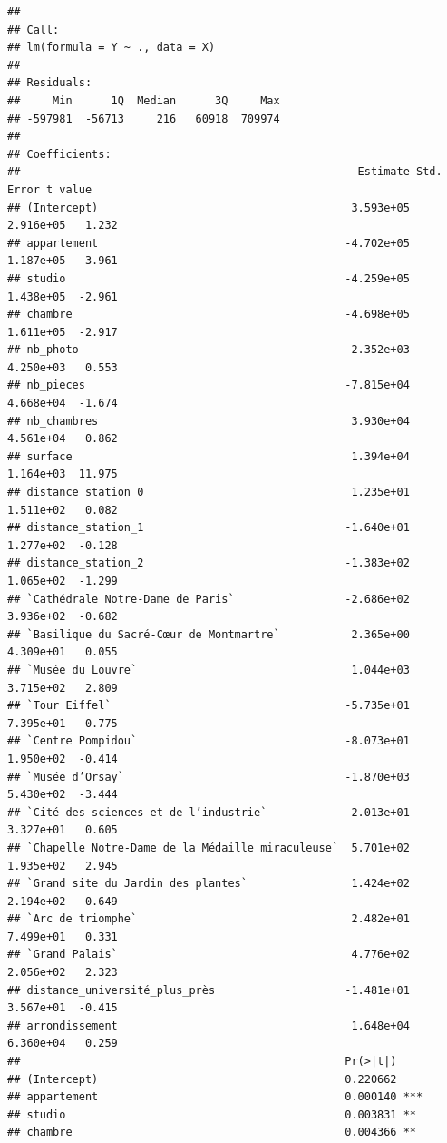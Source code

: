 \documentclass[french,]{article}
\begin{document}
\begin{verbatim}
## 
## Call:
## lm(formula = Y ~ ., data = X)
## 
## Residuals:
##     Min      1Q  Median      3Q     Max 
## -597981  -56713     216   60918  709974 
## 
## Coefficients:
##                                                    Estimate Std. Error t value
## (Intercept)                                       3.593e+05  2.916e+05   1.232
## appartement                                      -4.702e+05  1.187e+05  -3.961
## studio                                           -4.259e+05  1.438e+05  -2.961
## chambre                                          -4.698e+05  1.611e+05  -2.917
## nb_photo                                          2.352e+03  4.250e+03   0.553
## nb_pieces                                        -7.815e+04  4.668e+04  -1.674
## nb_chambres                                       3.930e+04  4.561e+04   0.862
## surface                                           1.394e+04  1.164e+03  11.975
## distance_station_0                                1.235e+01  1.511e+02   0.082
## distance_station_1                               -1.640e+01  1.277e+02  -0.128
## distance_station_2                               -1.383e+02  1.065e+02  -1.299
## `Cathédrale Notre-Dame de Paris`                 -2.686e+02  3.936e+02  -0.682
## `Basilique du Sacré-Cœur de Montmartre`           2.365e+00  4.309e+01   0.055
## `Musée du Louvre`                                 1.044e+03  3.715e+02   2.809
## `Tour Eiffel`                                    -5.735e+01  7.395e+01  -0.775
## `Centre Pompidou`                                -8.073e+01  1.950e+02  -0.414
## `Musée d’Orsay`                                  -1.870e+03  5.430e+02  -3.444
## `Cité des sciences et de l’industrie`             2.013e+01  3.327e+01   0.605
## `Chapelle Notre-Dame de la Médaille miraculeuse`  5.701e+02  1.935e+02   2.945
## `Grand site du Jardin des plantes`                1.424e+02  2.194e+02   0.649
## `Arc de triomphe`                                 2.482e+01  7.499e+01   0.331
## `Grand Palais`                                    4.776e+02  2.056e+02   2.323
## distance_université_plus_près                    -1.481e+01  3.567e+01  -0.415
## arrondissement                                    1.648e+04  6.360e+04   0.259
##                                                  Pr(>|t|)    
## (Intercept)                                      0.220662    
## appartement                                      0.000140 ***
## studio                                           0.003831 ** 
## chambre                                          0.004366 ** 

\end{verbatim}
\end{document}
